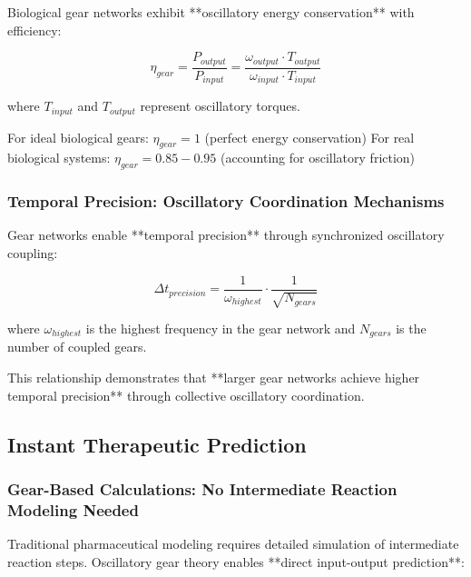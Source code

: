 Biological gear networks exhibit **oscillatory energy conservation** with efficiency:

\begin{equation}
\eta_{gear} = \frac{P_{output}}{P_{input}} = \frac{\omega_{output} \cdot T_{output}}{\omega_{input} \cdot T_{input}}
\end{equation}

where $T_{input}$ and $T_{output}$ represent oscillatory torques.

For ideal biological gears: $\eta_{gear} = 1$ (perfect energy conservation)
For real biological systems: $\eta_{gear} = 0.85 - 0.95$ (accounting for oscillatory friction)

\subsubsection{Temporal Precision: Oscillatory Coordination Mechanisms}

Gear networks enable **temporal precision** through synchronized oscillatory coupling:

\begin{equation}
\Delta t_{precision} = \frac{1}{\omega_{highest}} \cdot \frac{1}{\sqrt{N_{gears}}}
\end{equation}

where $\omega_{highest}$ is the highest frequency in the gear network and $N_{gears}$ is the number of coupled gears.

This relationship demonstrates that **larger gear networks achieve higher temporal precision** through collective oscillatory coordination.

\subsection{Instant Therapeutic Prediction}

\subsubsection{Gear-Based Calculations: No Intermediate Reaction Modeling Needed}

Traditional pharmaceutical modeling requires detailed simulation of intermediate reaction steps. Oscillatory gear theory enables **direct input-output prediction**:

